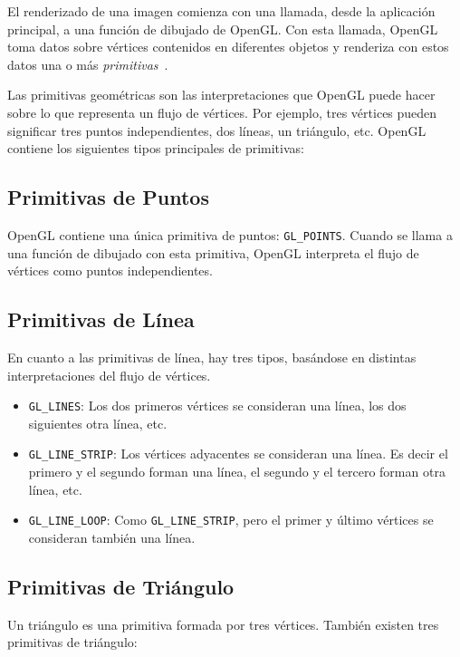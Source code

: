 El renderizado de una imagen comienza con una llamada, desde la aplicación
principal, a una función de dibujado de OpenGL. Con esta llamada, OpenGL toma
datos sobre vértices contenidos en diferentes objetos y renderiza con estos
datos una o más \textit{primitivas}~\cite{Primitivas}. 

Las primitivas geométricas son las interpretaciones que OpenGL puede
hacer sobre lo que representa un flujo de vértices. Por ejemplo, tres vértices
pueden significar tres puntos independientes, dos líneas, un triángulo, etc.
OpenGL contiene los siguientes tipos principales de primitivas:

\subsection{Primitivas de Puntos}
\label{ref:points}

OpenGL contiene una única primitiva de puntos: \verb|GL_POINTS|. Cuando se llama
a una función de dibujado con esta primitiva, OpenGL interpreta el flujo de
vértices como puntos independientes.

\subsection{Primitivas de Línea}
\label{ref:lines}

En cuanto a las primitivas de línea, hay tres tipos, basándose en distintas
interpretaciones del flujo de vértices.

\begin{itemize}
		\item \verb|GL_LINES|: Los dos primeros vértices se consideran una línea,
				los dos siguientes otra línea, etc.
		\item \verb|GL_LINE_STRIP|: Los vértices adyacentes se consideran una
			línea. Es decir el primero y el segundo forman una línea, el segundo
			y el tercero forman otra línea, etc.
		\item \verb|GL_LINE_LOOP|: Como \verb|GL_LINE_STRIP|, pero el primer y
				último vértices se consideran también una línea.
\end{itemize}

\subsection{Primitivas de Triángulo}
\label{ref:triangles}

Un triángulo es una primitiva formada por tres vértices. También existen tres
primitivas de triángulo:

